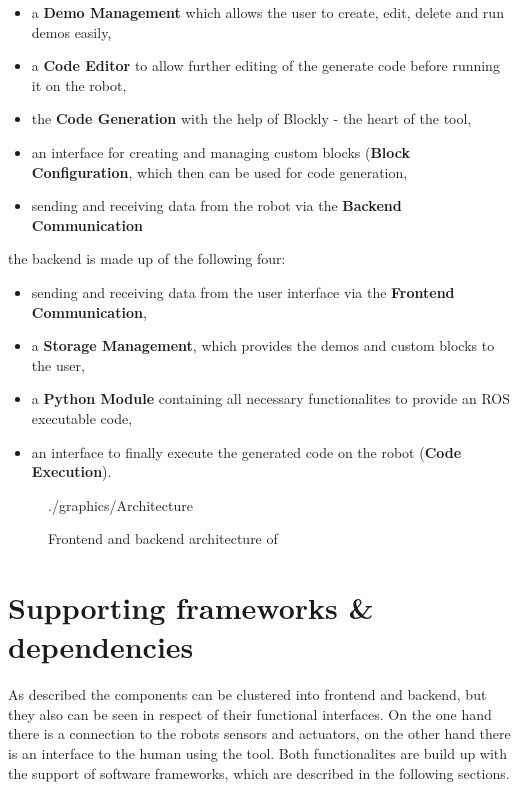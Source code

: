 \begin{itemize}
	\item a \textbf{Demo Management} which allows the user to create, edit, delete and run demos easily,
	\item a \textbf{Code Editor} to allow further editing of the generate code before running it on the robot,
	\item the \textbf{Code Generation} with the help of Blockly - the heart of the tool,
	\item an interface for creating and managing custom blocks (\textbf{Block Configuration}, which then can be used for code generation,
	\item sending and receiving data from the robot via the \textbf{Backend Communication}
\end{itemize}

the backend is made up of the following four:

\begin{itemize}
	\item sending and receiving data from the user interface via the \textbf{Frontend Communication},
	\item a \textbf{Storage Management}, which provides the demos and custom blocks to the user,
	\item a \textbf{Python Module} containing all necessary functionalites to provide an ROS executable code,
	\item an interface to finally execute the generated code on the robot (\textbf{Code Execution}).
\end{itemize}


\begin{figure}[htbp]
	\centering
	\begin{overpic}[width=\linewidth]{./graphics/Architecture}
	\end{overpic}
	\caption{Frontend and backend architecture of \toolname{}}%
	\label{fig:Architecture}%
\end{figure}

\section{Supporting frameworks \& dependencies}
As described the components can be clustered into frontend and backend, but they also can be seen in respect of their functional interfaces. On the one hand there is a connection to the robots sensors and actuators, on the other hand there is an interface to the human using the tool. Both functionalites are build up with the support of software frameworks, which are described in the following sections.

